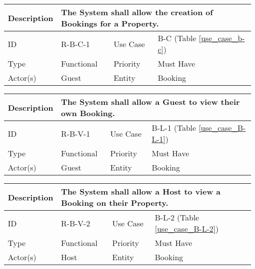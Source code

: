 \begin{tabular}{|p{1.5cm}|p{1.5cm}|p{1.5cm}|p{1.5cm}|p{1.5cm}|p{1.5cm}|p{1.5cm}|p{1.5cm}|p{1.5cm}|p{1.5cm}|p{1.5cm}|p{1.5cm}|}
    \hline
    \multicolumn{2}{|o|}{Description} & \multicolumn{10}{p{12.5cm}|}{The System shall allow the creation of Bookings for a Property.} \\ \hline
    \multicolumn{2}{|o|}{ID}          & \multicolumn{4}{n}{R-B-C-1}            & \multicolumn{2}{|o|}{Use Case}    & \multicolumn{4}{n|}{B-C (Table \ref{use_case_b-c})} \\ \hline
    \multicolumn{2}{|o|}{Type}        & \multicolumn{4}{n}{Functional}         & \multicolumn{2}{|o|}{Priority}    & \multicolumn{4}{n|}{Must Have}  \\ \hline
    \multicolumn{2}{|o|}{Actor(s)}    & \multicolumn{4}{n}{Guest}              & \multicolumn{2}{|o|}{Entity}      & \multicolumn{4}{n|}{Booking} \\ \hline
\end{tabular}

\begin{tabular}{|p{1.5cm}|p{1.5cm}|p{1.5cm}|p{1.5cm}|p{1.5cm}|p{1.5cm}|p{1.5cm}|p{1.5cm}|p{1.5cm}|p{1.5cm}|p{1.5cm}|p{1.5cm}|}
    \hline
    \multicolumn{2}{|o|}{Description} & \multicolumn{10}{p{12.5cm}|}{The System shall allow a Guest to view their own Booking.} \\ \hline
    \multicolumn{2}{|o|}{ID}          & \multicolumn{4}{n}{R-B-V-1}            & \multicolumn{2}{|o|}{Use Case}    & \multicolumn{4}{n|}{B-L-1 (Table \ref{use_case_B-L-1})} \\ \hline
    \multicolumn{2}{|o|}{Type}        & \multicolumn{4}{n}{Functional}         & \multicolumn{2}{|o|}{Priority}    & \multicolumn{4}{n|}{Must Have}  \\ \hline
    \multicolumn{2}{|o|}{Actor(s)}    & \multicolumn{4}{n}{Guest}              & \multicolumn{2}{|o|}{Entity}      & \multicolumn{4}{n|}{Booking} \\ \hline
\end{tabular}

\begin{tabular}{|p{1.5cm}|p{1.5cm}|p{1.5cm}|p{1.5cm}|p{1.5cm}|p{1.5cm}|p{1.5cm}|p{1.5cm}|p{1.5cm}|p{1.5cm}|p{1.5cm}|p{1.5cm}|}
    \hline
    \multicolumn{2}{|o|}{Description} & \multicolumn{10}{p{12.5cm}|}{The System shall allow a Host to view a Booking on their Property.} \\ \hline
    \multicolumn{2}{|o|}{ID}          & \multicolumn{4}{n}{R-B-V-2}            & \multicolumn{2}{|o|}{Use Case}    & \multicolumn{4}{n|}{B-L-2 (Table \ref{use_case_B-L-2})} \\ \hline
    \multicolumn{2}{|o|}{Type}        & \multicolumn{4}{n}{Functional}         & \multicolumn{2}{|o|}{Priority}    & \multicolumn{4}{n|}{Must Have}  \\ \hline
    \multicolumn{2}{|o|}{Actor(s)}    & \multicolumn{4}{n}{Host}               & \multicolumn{2}{|o|}{Entity}      & \multicolumn{4}{n|}{Booking} \\ \hline
\end{tabular}

